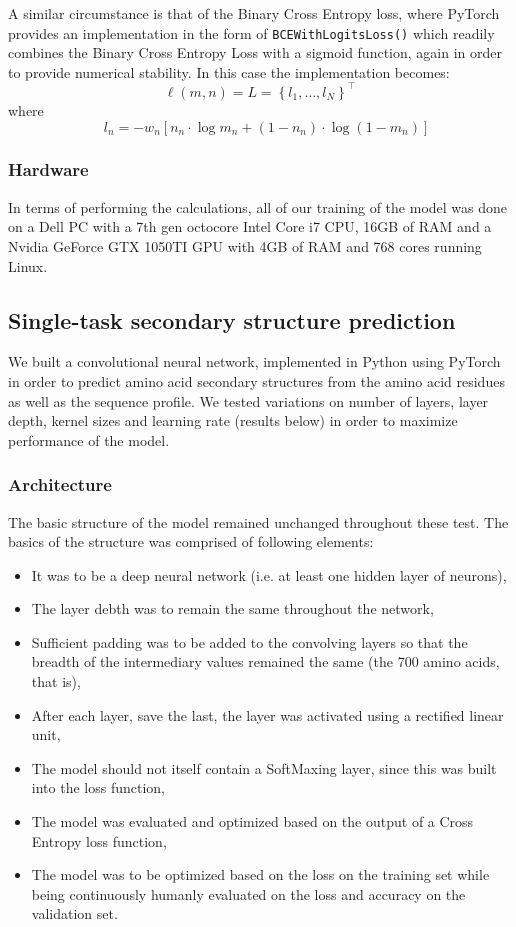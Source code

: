 \begin{multicols}{2}
\noindent A similar circumstance is that of the Binary Cross Entropy loss, where PyTorch provides an implementation in the form of \texttt{BCEWithLogitsLoss()} which readily combines the Binary Cross Entropy Loss with a sigmoid function, again in order to provide numerical stability. In this case the implementation becomes: \\
\[
\ell(m, n)=L=\left\{l_{1}, \ldots, l_{N}\right\}^{\top}
\]
where
\[ \quad l_{n}=-w_{n}\left[n_{n} \cdot \log m_{n}+\left(1-n_{n}\right) \cdot \log \left(1-m_{n}\right)\right]
\]

\subsubsection{Hardware}
In terms of performing the calculations, all of our training of the model was done on a Dell PC with a 7th gen octocore Intel Core i7 CPU, 16GB of RAM and a Nvidia GeForce GTX 1050TI GPU with 4GB of RAM and 768 cores running Linux.

\subsection{Single-task secondary structure prediction}
We built a convolutional neural network, implemented in Python using PyTorch in order to predict amino acid secondary structures from the amino acid residues as well as the sequence profile. We tested variations on number of layers, layer depth, kernel sizes and learning rate (results below) in order to maximize performance of the model. 

\subsubsection{Architecture}

The basic structure of the model remained unchanged throughout these test. The basics of the structure was comprised of following elements:
\begin{itemize}
\item It was to be a deep neural network (i.e. at least one hidden layer of neurons),
\item The layer debth was to remain the same throughout the network,
\item Sufficient padding was to be added to the convolving layers so that the breadth of the intermediary values remained the same (the 700 amino acids, that is),
\item After each layer, save the last, the layer was activated using a rectified linear unit,
\item The model should not itself contain a SoftMaxing layer, since this was built into the loss function,
\item The model was evaluated and optimized based on the output of a Cross Entropy loss function,
\item The model was to be optimized based on the loss on the training set while being continuously humanly evaluated on the loss and accuracy on the validation set.
\end{itemize}


\end{multicols}

